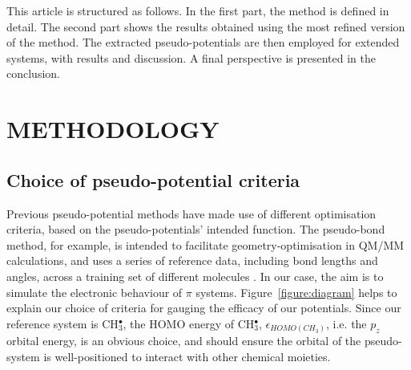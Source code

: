 \documentclass[12pt]{article}
\begin{document}

This article is structured as follows.
In the first part, the method is defined in detail.
The second part shows the results obtained using the most refined version of the method. The extracted pseudo-potentials are then employed for extended systems, with results and discussion. A final perspective is presented in the conclusion.

\section*{\sffamily \Large METHODOLOGY}

\subsection*{\sffamily \large Choice of pseudo-potential criteria \label{section:pseudocrit}} 

Previous pseudo-potential methods have made use of different optimisation criteria, based on the pseudo-potentials' intended function. 
The pseudo-bond method, for example, is intended to facilitate geometry-optimisation in QM/MM calculations, and uses a series of reference data, 
including bond lengths and angles, across a training set of different molecules \cite{zhang_pseudobond_1998}. 
In our case, the aim is to simulate the electronic behaviour of $\pi$ systems.
Figure~\ref{figure:diagram} helps to explain our choice of criteria 
for gauging the efficacy of our potentials. Since our reference 
system is CH$_3^\bullet$, the HOMO energy of CH$_3^{\bullet}$, $\epsilon_{HOMO(CH_3)}$, i.e. the $p_{z}$ orbital energy, 
is an obvious choice, and should ensure the orbital of the pseudo-system is well-positioned to interact with other chemical moieties.
\end{document}
